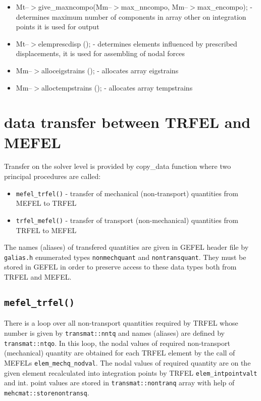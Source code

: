 \begin{itemize}
\item
Mt--$>$give\_maxncompo(Mm--$>$max\_nncompo, Mm--$>$max\_encompo); - determines
maximum number of components in array other on integration points
it is used for output

\item
Mt--$>$elemprescdisp (); - determines elements influenced by prescribed
displacements, it is used for assembling of nodal forces

\item
Mm--$>$alloceigstrains (); - allocates array eigstrains 

\item
Mm--$>$alloctempstrains (); - allocates array tempstrains

\end{itemize}

\section{data transfer between TRFEL and MEFEL}
Transfer on the solver level is provided by copy_data function
where two principal procedures are called:
\begin{itemize}
\item {\tt mefel\_trfel()} - transfer of mechanical (non-transport) quantities from MEFEL to TRFEL
\item {\tt trfel\_mefel()} - transfer of transport (non-mechanical) quantities from TRFEL to MEFEL 
\end{itemize}
The names (aliases) of transfered quantities are given in GEFEL header file by
{\tt galias.h} enumerated types {\tt nonmechquant} and {\tt nontransquant}.
They must be stored in GEFEL in order to preserve access to these data types both from 
TRFEL and MEFEL.


\subsection {{\tt mefel\_trfel()}}
There is a loop over all non-transport quantities required by TRFEL whose number is given
by {\tt transmat::nntq} and names (aliases) are defined by {\tt transmat::ntqo}.
In this loop, the nodal values of required non-transport (mechanical) quantity are obtained for 
each TRFEL element by the call of MEFELs {\tt elem\_mechq\_nodval}. The nodal values
of required quantity are on the given element recalculated into integration points by
TRFEL {\tt elem\_intpointvalt} and int. point values are stored in {\tt transmat::nontranq} array
with help of {\tt mehcmat::storenontransq}.

